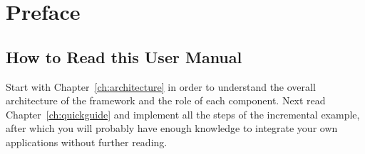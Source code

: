 {%
}

\chapter*{Preface}

\section*{How to Read this User Manual}

Start with Chapter~\ref{ch:architecture} in order to understand the
overall architecture of the \ei framework and the role of each
component. 
%
Next read Chapter~\ref{ch:quickguide} and implement all the steps of
the incremental example, after which you will probably have enough
knowledge to integrate your own applications without further reading.

